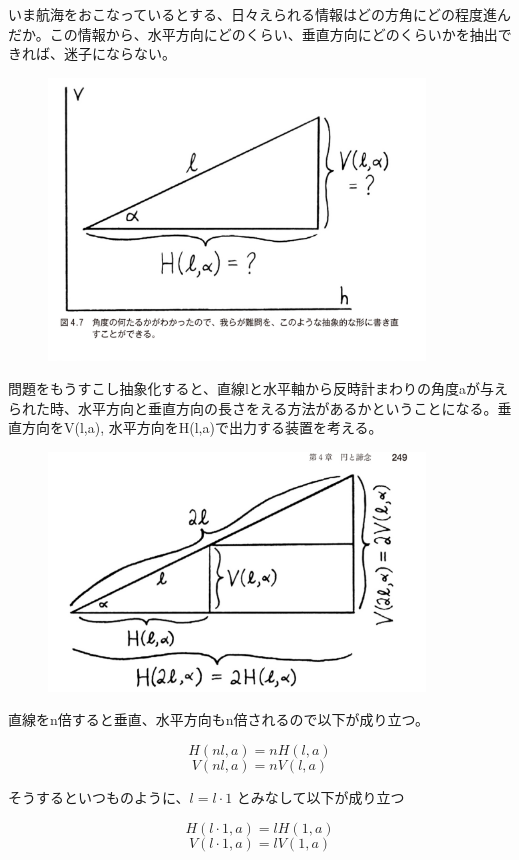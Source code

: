 \documentclass[dvipdfmx]{jsarticle}
\begin{document}
いま航海をおこなっているとする、日々えられる情報はどの方角にどの程度進んだか。この情報から、水平方向にどのくらい、垂直方向にどのくらいかを抽出できれば、迷子にならない。

\begin{figure}[h]
  \centering
  \includegraphics[width=10cm]{images/burn_math_4-7.png}
\end{figure}

問題をもうすこし抽象化すると、直線lと水平軸から反時計まわりの角度aが与えられた時、水平方向と垂直方向の長さをえる方法があるかということになる。垂直方向をV(l,a), 水平方向をH(l,a)で出力する装置を考える。

\begin{figure}[h]
  \centering
  \includegraphics[width=10cm]{images/burn_math_4-8.png}
\end{figure}

直線をn倍すると垂直、水平方向もn倍されるので以下が成り立つ。

\[ H(nl,a) = nH(l,a) \]
\[ V(nl,a) = nV(l,a) \]

そうするといつものように、$l= l \cdot 1$ とみなして以下が成り立つ

\[ H(l\cdot 1,a) = lH(1,a) \]
\[ V(l\cdot 1,a) = lV(1,a) \]
\end{document}

